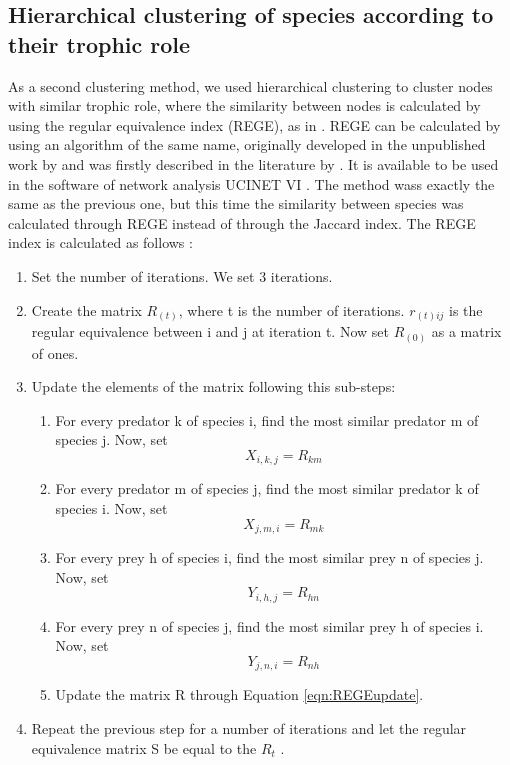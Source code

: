 \documentclass[twocolumn]{article}
\begin{document}
    \subsection*{Hierarchical clustering of species according to their trophic role}
        As a second clustering method, we used hierarchical clustering to cluster nodes with similar trophic role, where the similarity between nodes is calculated by using the regular equivalence index (REGE), as in \citet{Luczkovich2003}. REGE can be calculated by using an algorithm of the same name, originally developed in the unpublished work by \citet{DouglasWhite1980,DouglasWhite1982,DouglasWhite1984} and was firstly described in the literature by \citet{Borgatti1993}. It is available to be used in the software of network analysis UCINET VI \citep{Borgatti2002}. The method wass exactly the same as the previous one, but this time the similarity between species was calculated through REGE instead of through the Jaccard index. The REGE index is calculated as follows \citep{Jordan2018}:
        \begin{enumerate}
            \item Set the number of iterations. We set 3 iterations. 
            \item Create the matrix $ R_{(t)} $, where t is the number of iterations. $     r_{(t)ij} $ is the regular equivalence between i and j at iteration t. Now set $ R_{(0)} $ as a matrix of ones. 
            \item Update the elements of the matrix following this sub-steps: 
            \begin{enumerate}
                \item For every predator k of species i, find the most similar predator m of     species j. Now, set $$ X_{i,k,j}=R_{km} $$ 
                \item For every predator m of species j, find the most similar predator k of     species i. Now, set $$ X_{j,m,i}=R_{mk} $$
                \item  For every prey h of species i, find the most similar prey n of species j. Now, set $$ Y_{i,h,j}=R_{hn} $$
                \item For every prey n of species j, find the most similar prey h of species i. Now, set $$ Y_{j,n,i}=R_{nh} $$ 
                \item Update the matrix R through Equation \ref{eqn:REGEupdate}. 
            \end{enumerate}
            \item Repeat the previous step for a number of iterations and let the regular equivalence matrix S be equal to the $ R_{t} $ . 
        \end{enumerate}
\end{document}
